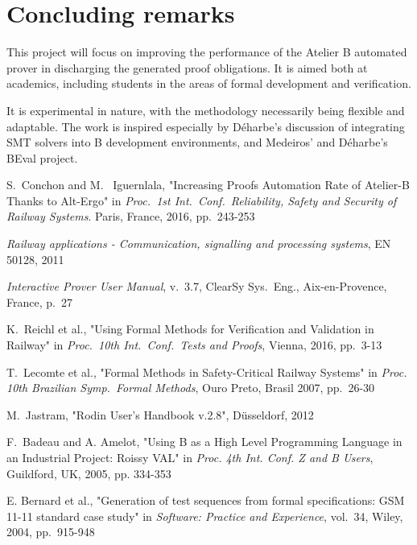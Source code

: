 \documentclass[11pt,journal]{IEEEtran}
\begin{document}
	\section{Concluding remarks}
	This project will focus on improving the performance of the Atelier B automated prover in discharging the generated proof obligations. It is aimed both at academics, including students in the areas of formal development and verification.
	
	It is experimental in nature, with the methodology necessarily being flexible and adaptable. The work is inspired especially by D\'{e}harbe's discussion of integrating SMT solvers into B development environments, and Medeiros' and D\'{e}harbe's BEval project.
	
	\IEEEPARstart{}{} 
	
	\begin{thebibliography}{1}
		S.~Conchon and M.~ Iguernlala, "Increasing Proofs Automation Rate of Atelier-B Thanks to Alt-Ergo" in \emph{Proc.~1st Int.~Conf.~Reliability, Safety and Security of Railway Systems}. Paris, France, 2016, pp.~243-253
		
		\emph{Railway applications - Communication, signalling and processing systems}, EN 50128, 2011
		
		\emph{Interactive Prover User Manual}, v.~3.7, ClearSy Sys.~Eng., Aix-en-Provence, France, p.~27
		
		K.~Reichl et al., "Using Formal Methods for Verification and Validation in Railway" in \emph{Proc.~10th Int.~Conf.~Tests and Proofs}, Vienna, 2016, pp.~3-13
		
		T.~Lecomte et al., "Formal Methods in Safety-Critical Railway Systems" in \emph{Proc. 10th Brazilian Symp.~Formal Methods}, Ouro Preto, Brasil 2007, pp.~26-30
		
		M.~Jastram, "Rodin User's Handbook v.2.8", D\"{u}sseldorf, 2012
		
		F.~Badeau and A. Amelot, "Using B as a High Level Programming Language in an Industrial Project: Roissy VAL" in \emph{Proc. 4th Int. Conf. Z and B Users}, Guildford, UK, 2005, pp. 334-353
		
		E. Bernard et al., "Generation of test sequences from formal specifications: GSM 11-11 standard case study" in \emph{Software: Practice and Experience}, vol.~34, Wiley, 2004, pp.~915-948
		

\end{thebibliography}
\end{document}
